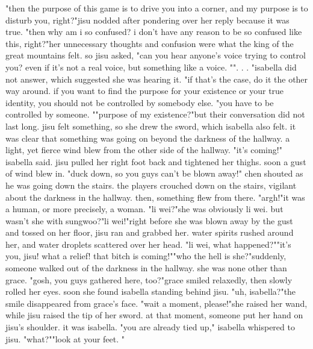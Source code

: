 "then the purpose of this game is to drive you into a corner, and my purpose is to disturb you, right?"jisu nodded after pondering over her reply because it was true.
"then why am i so confused? i don't have any reason to be so confused like this, right?"her unnecessary thoughts and confusion were what the king of the great mountains felt.
so jisu asked, "can you hear anyone's voice trying to control you? even if it's not a real voice, but something like a voice.
"".
.
.
"isabella did not answer, which suggested she was hearing it.
"if that's the case, do it the other way around.
 if you want to find the purpose for your existence or your true identity, you should not be controlled by somebody else.
"you have to be controlled by someone.
""purpose of my existence?"but their conversation did not last long.
jisu felt something, so she drew the sword, which isabella also felt.
it was clear that something was going on beyond the darkness of the hallway.
a light, yet fierce wind blew from the other side of the hallway.
"it's coming!" isabella said.
jisu pulled her right foot back and tightened her thighs.
soon a gust of wind blew in.
"duck down, so you guys can't be blown away!" chen shouted as he was going down the stairs.
 the players crouched down on the stairs, vigilant about the darkness in the hallway.
 then, something flew from there.
"argh!"it was a human, or more precisely, a woman.
"li wei?"she was obviously li wei.
 but wasn't she with sungwoo?"li wei!"right before she was blown away by the gust and tossed on her floor, jisu ran and grabbed her.
 water spirits rushed around her, and water droplets scattered over her head.
"li wei, what happened?""it's you, jisu! what a relief! that bitch is coming!""who the hell is she?"suddenly, someone walked out of the darkness in the hallway.
 she was none other than grace.
"gosh, you guys gathered here, too?"grace smiled relaxedly, then slowly rolled her eyes.
 soon she found isabella standing behind jisu.
"uh, isabella?"the smile disappeared from grace's face.
"wait a moment, please!"she raised her wand, while jisu raised the tip of her sword.
at that moment, someone put her hand on jisu's shoulder.
 it was isabella.
"you are already tied up," isabella whispered to jisu.
"what?""look at your feet.
"

